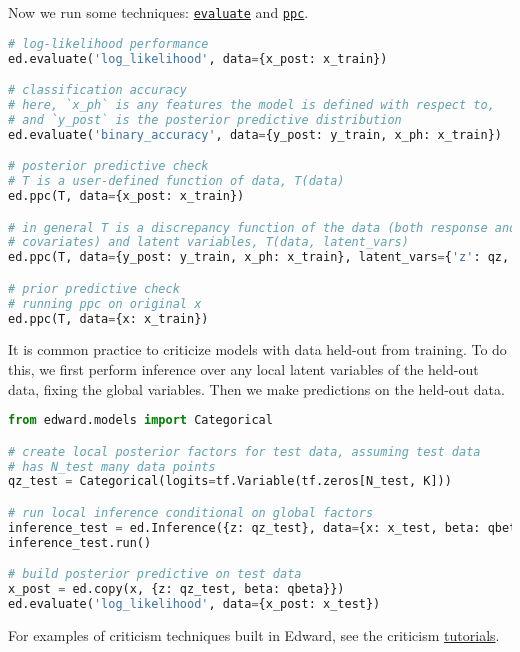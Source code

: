Now we run some techniques:
\href{/tutorials/point-evaluation}{\texttt{evaluate}}
and
\href{/tutorials/ppc}{\texttt{ppc}}.

\begin{lstlisting}[language=Python]
# log-likelihood performance
ed.evaluate('log_likelihood', data={x_post: x_train})

# classification accuracy
# here, `x_ph` is any features the model is defined with respect to,
# and `y_post` is the posterior predictive distribution
ed.evaluate('binary_accuracy', data={y_post: y_train, x_ph: x_train})

# posterior predictive check
# T is a user-defined function of data, T(data)
ed.ppc(T, data={x_post: x_train})

# in general T is a discrepancy function of the data (both response and
# covariates) and latent variables, T(data, latent_vars)
ed.ppc(T, data={y_post: y_train, x_ph: x_train}, latent_vars={'z': qz, 'beta': qbeta})

# prior predictive check
# running ppc on original x
ed.ppc(T, data={x: x_train})
\end{lstlisting}

It is common practice to criticize models with data held-out from
training. To do this, we first perform inference over any local latent
variables of the held-out data, fixing the global variables.  Then we
make predictions on the held-out data.

\begin{lstlisting}[language=Python]
from edward.models import Categorical

# create local posterior factors for test data, assuming test data
# has N_test many data points
qz_test = Categorical(logits=tf.Variable(tf.zeros[N_test, K]))

# run local inference conditional on global factors
inference_test = ed.Inference({z: qz_test}, data={x: x_test, beta: qbeta})
inference_test.run()

# build posterior predictive on test data
x_post = ed.copy(x, {z: qz_test, beta: qbeta}})
ed.evaluate('log_likelihood', data={x_post: x_test})
\end{lstlisting}

For examples of criticism techniques built in Edward, see the
criticism
\href{/tutorials/}{tutorials}.


